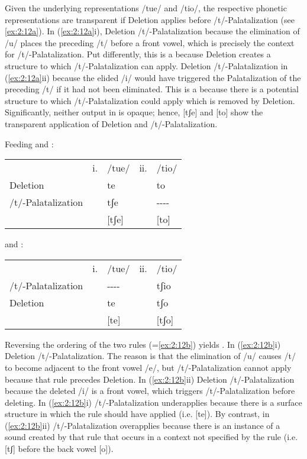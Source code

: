 \begin{xlist}
\begin{xlist}
\begin{sloppypar}
Given the underlying representations /tue/ and /tio/, the respective phonetic representations are transparent if Deletion applies before /t/-Palatalization (see \ref{ex:2:12a}). In (\ref{ex:2:12a}i), Deletion  /t/-Palatalization because the elimination of /u/ places the preceding /t/ before a front vowel, which is precisely the context for /t/-Palatalization. Put differently, this is a  because Deletion creates a structure to which /t/-Palatalization can apply. Deletion  /t/-Palatalization in (\ref{ex:2:12a}ii) because the elided /i/ would have triggered the Palatalization of the preceding /t/ if it had not been eliminated. This is a  because there is a potential structure to which /t/-Palatalization could apply which is removed by Deletion. Significantly, neither output in  is opaque; hence, [tʃe] and [to] show the transparent application of Deletion and /t/-Palatalization.
\end{sloppypar}

\ea%
    \label{ex:2:12}
\ea Feeding and :\label{ex:2:12a}\\
    \begin{tabular}{ll@{ }ll@{ }l}
                     & i. & /tue/  & ii. &  /tio/       \\
  Deletion           &    &  te    &     &    to        \\
  /t/-Palatalization &    &  tʃe   &     &  {}-{}-{}-{}-\\  
                     &    & [tʃe]  &     &  [to]        \\
     \end{tabular}
\ex {} and :\label{ex:2:12b}\\
\begin{tabular}{ll@{ }ll@{ }l}
                    &  i.&     /tue/   & ii. &   /tio/\\
 /t/-Palatalization &    & -{}-{}-{}-  &     &   tʃio \\
 Deletion           &    &    te       &     &   tʃo  \\
                    &    &   [te]      &     &  [tʃo] \\
\end{tabular}
\z 
\z

Reversing the ordering of the two rules (=\ref{ex:2:12b}) yields . In (\ref{ex:2:12b}i) Deletion  /t/-Palatalization. The reason is that the elimination of /u/ causes /t/ to become adjacent to the front vowel /e/, but /t/-Palatalization cannot apply because that rule precedes Deletion. In (\ref{ex:2:12b}ii) Deletion  /t/-Palatalization because the deleted /i/ is a front vowel, which triggers /t/-Pal\-a\-tal\-i\-za\-tion before deleting. In (\ref{ex:2:12b}i) /t/-Palatalization underapplies because there is a surface structure in which the rule should have applied (i.e. [te]). By contrast, in (\ref{ex:2:12b}ii) /t/-Palatalization overapplies because there is an instance of a sound created by that rule that occurs in a context not specified by the rule (i.e. [tʃ] before the back vowel [o]).


\end{xlist}
\end{xlist}
